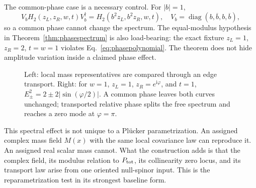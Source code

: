 \documentclass[11pt]{article}
\newcommand{\ii}{\mathrm{i}}
\newcommand{\diag}{\operatorname{diag}}
\begin{document}
The common-phase case is a necessary control.  For $|b|=1$,
\begin{equation}\label{eq:commonphaseconjugacy}
 V_bH_2(z_L,z_R,w,t)V_b^\dagger
 =H_2(b^2z_L,b^2z_R,w,t),
 \quad
 V_b=\diag(b,\overline b,b,\overline b),
\end{equation}
so a common phase cannot change the spectrum.  The equal-modulus hypothesis in
Theorem~\ref{thm:phasespectrum} is also load-bearing: the exact fixture
$z_L=1$, $z_R=2$, $t=w=1$ violates Eq.~\eqref{eq:phasepolynomial}.  The theorem
does not hide amplitude variation inside a claimed phase effect.

\begin{figure}[t]
\centering
{}
\caption{Left: local mass representatives are compared through an edge
transport.  Right: for $w=1$, $z_L=1$, $z_R=e^{\ii\varphi}$, and $t=1$,
$E_\pm^2=2\pm2|\sin(\varphi/2)|$.  A common phase leaves both curves
unchanged; transported relative phase splits the free spectrum and reaches a
zero mode at $\varphi=\pi$.}
\label{fig:phasespectrum}
\end{figure}

This spectral effect is not unique to a Pl\"ucker parametrization.  An assigned
complex mass field $M(x)$ with the same local covariance law can reproduce it.
An assigned real scalar mass cannot.  What the construction adds is that the
complex field, its modulus relation to $P_{\rm tot}$, its collinearity zero
locus, and its transport law arise from one oriented null-spinor input.  This
is the reparametrization test in its strongest baseline form.
\end{document}
